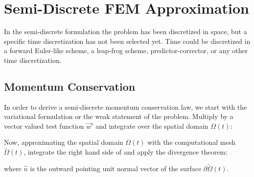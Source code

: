 \section{Semi-Discrete FEM Approximation}
In the semi-discrete formulation the problem has been discretized in space, but a specific time discretization has not been selected yet. Time could be discretized in a forward Euler-like scheme, a leap-frog scheme, predictor-corrector, or any other time discretization.

\subsection{Momentum Conservation}\label{sec:MomentumCons}
In order to derive a semi-discrete momentum conservation law, we start with the variational formulation or the weak statement of the problem. Multiply  by a vector valued test function $\vec w'$ and integrate over the spatial domain $\Omega(t)$:


Now, approximating the spatial domain $\Omega(t)$ with the computational mesh $\tilde \Omega(t)$, integrate the right hand side of  and apply the divergence theorem:


where $\hat{n}$ is the outward pointing unit normal vector of the surface $\partial\tilde{\Omega}(t)$.

